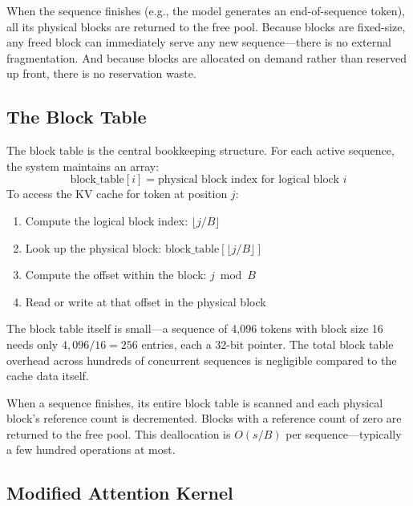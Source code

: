 When the sequence finishes (e.g., the model generates an end-of-sequence token), all its physical blocks are returned to the free pool. Because blocks are fixed-size, any freed block can immediately serve any new sequence---there is no external fragmentation. And because blocks are allocated on demand rather than reserved up front, there is no reservation waste.

\subsection{The Block Table}

%
The block table is the central bookkeeping structure. For each active sequence, the system maintains an array:
\[
\text{block\_table}[i] = \text{physical block index for logical block } i
\]
To access the KV cache for token at position $j$:
\begin{enumerate}
  \item Compute the logical block index: $\lfloor j / B \rfloor$
  \item Look up the physical block: $\text{block\_table}[\lfloor j / B \rfloor]$
  \item Compute the offset within the block: $j \bmod B$
  \item Read or write at that offset in the physical block
\end{enumerate}

The block table itself is small---a sequence of 4,096 tokens with block size 16 needs only $4{,}096 / 16 = 256$ entries, each a 32-bit pointer. The total block table overhead across hundreds of concurrent sequences is negligible compared to the cache data itself.

%
When a sequence finishes, its entire block table is scanned and each physical block's reference count is decremented. Blocks with a reference count of zero are returned to the free pool. This deallocation is $O(s / B)$ per sequence---typically a few hundred operations at most.

\subsection{Modified Attention Kernel}

